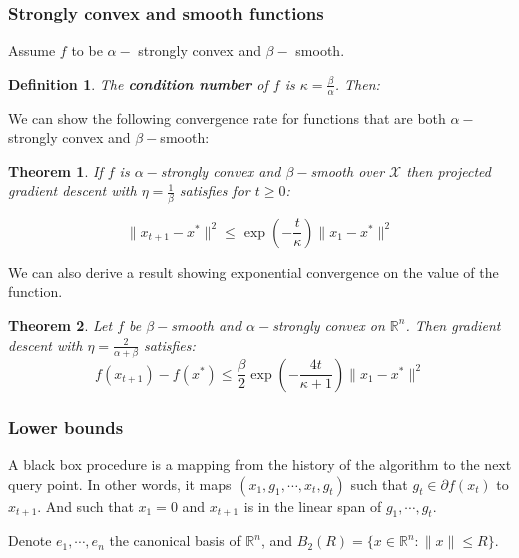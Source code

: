 \documentclass{article}
\newtheorem{theorem}{Theorem}
\newtheorem{definition}{Definition}
\begin{document}
\subsubsection{Strongly convex and smooth functions}

Assume $f$ to be $\alpha-$ strongly convex and $\beta-$ smooth. 

\begin{definition}
The \textbf{condition number} of $f$ is $\kappa = \frac{\beta}{\alpha}$. Then:
\end{definition}

We can show the following convergence rate for functions that are both $\alpha-$strongly convex and $\beta-$smooth:

\begin{theorem}
If $f$ is $\alpha-$strongly convex and $\beta-$smooth over $\mathcal{X}$ then projected gradient descent with $\eta = \frac{1}{\beta}$ satisfies for $t \geq 0$:

\begin{equation}
\parallel x_{t+1} - x^*\parallel^2 \leq \exp(-\frac{t}{\kappa})\parallel x_1 - x^*\parallel^2
\end{equation}


\end{theorem}

We can also derive a result showing exponential convergence on the value of the function. 

\begin{theorem}
Let $f$ be $\beta-$smooth and $\alpha-$strongly convex on $\mathbb{R}^n$. Then gradient descent with $\eta = \frac{2}{\alpha+\beta}$ satisfies:
\begin{equation}
f(x_{t+1}) - f(x^*) \leq \frac{\beta}{2} \exp( -\frac{4t}{\kappa + 1}) \parallel x_1 - x^* \parallel^2
\end{equation}
\end{theorem}



\subsubsection{Lower bounds}

A black box procedure is a mapping from the history of the algorithm to the next query point. In other words, it maps $(x_1, g_1, \cdots, x_t, g_t)$ such that $g_t \in \partial f(x_t)$ to $x_{t+1}$. And such that $x_1 = 0$ and $x_{t+1}$ is in the linear span of $g_1, \cdots, g_t$. 

Denote $e_1, \cdots, e_n$ the canonical basis of $\mathbb{R}^n$, and $B_2(R) = \{ x \in \mathbb{R}^n : \parallel x \parallel \leq R\}$. 
\end{document}
